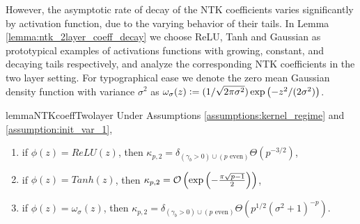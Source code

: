 However, the asymptotic rate of decay of the NTK coefficients varies significantly by activation function, due to the varying behavior of their tails. In Lemma \ref{lemma:ntk_2layer_coeff_decay} we choose ReLU, Tanh and Gaussian as prototypical examples of activations functions with growing, constant, and decaying tails respectively, and analyze the corresponding NTK coefficients in the two layer setting. For typographical ease we denote the zero mean Gaussian density function with variance $\sigma^2$ as $\omega_{\sigma}(z) \vcentcolon= (1/\sqrt{2 \pi \sigma^2}) \exp\left( -z^2/ (2 \sigma^2)\right)$.

\begin{restatable}{lemma}{NTKcoeffTwolayer}\label{lemma:ntk_2layer_coeff_decay}
    Under Assumptions \ref{assumptions:kernel_regime} and \ref{assumption:init_var_1},
    \begin{enumerate}
        \item if $\phi(z) = ReLU(z)$, then $\kappa_{p,2} = \delta_{(\gamma_b >0) \cup (p \text{ even})} \Theta(p^{-3/2})$,
        \item if $\phi(z) = Tanh(z)$, then $\kappa_{p,2} = \mathcal{O} \left(\exp\left( - \frac{\pi \sqrt{p-1}}{2}\right) \right)$,
        \item if $\phi(z) = \omega_{\sigma}(z)$, then $\kappa_{p,2} = \delta_{(\gamma_b >0) \cup (p \text{ even})}\Theta(p^{1/2} (\sigma^2+1)^{-p})$. 
    \end{enumerate}
\end{restatable}

